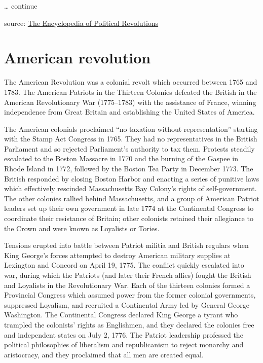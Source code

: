 \documentclass[
  openany]{book}
\begin{document}
\ldots{} continue

source: \url{The Encyclopedia of Political Revolutions}

\hypertarget{american-revolution}{%
\section{American revolution}\label{american-revolution}}

The American Revolution was a colonial revolt which occurred between 1765 and 1783. The American Patriots in the Thirteen Colonies defeated the British in the American Revolutionary War (1775--1783) with the assistance of France, winning independence from Great Britain and establishing the United States of America.

The American colonials proclaimed ``no taxation without representation'' starting with the Stamp Act Congress in 1765. They had no representatives in the British Parliament and so rejected Parliament's authority to tax them. Protests steadily escalated to the Boston Massacre in 1770 and the burning of the Gaspee in Rhode Island in 1772, followed by the Boston Tea Party in December 1773. The British responded by closing Boston Harbor and enacting a series of punitive laws which effectively rescinded Massachusetts Bay Colony's rights of self-government. The other colonies rallied behind Massachusetts, and a group of American Patriot leaders set up their own government in late 1774 at the Continental Congress to coordinate their resistance of Britain; other colonists retained their allegiance to the Crown and were known as Loyalists or Tories.

Tensions erupted into battle between Patriot militia and British regulars when King George's forces attempted to destroy American military supplies at Lexington and Concord on April 19, 1775. The conflict quickly escalated into war, during which the Patriots (and later their French allies) fought the British and Loyalists in the Revolutionary War. Each of the thirteen colonies formed a Provincial Congress which assumed power from the former colonial governments, suppressed Loyalism, and recruited a Continental Army led by General George Washington. The Continental Congress declared King George a tyrant who trampled the colonists' rights as Englishmen, and they declared the colonies free and independent states on July 2, 1776. The Patriot leadership professed the political philosophies of liberalism and republicanism to reject monarchy and aristocracy, and they proclaimed that all men are created equal.
\end{document}
